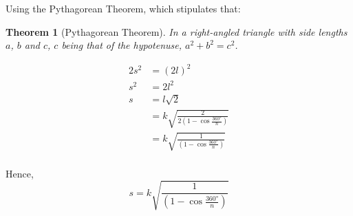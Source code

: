 \documentclass[12pt]{scrartcl}
\newtheorem{theorem}{Theorem}[section]
\begin{document}
Using the Pythagorean Theorem, which stipulates that:
\begin{theorem}[Pythagorean Theorem]
	In a right-angled triangle with side lengths $a$, $b$ and $c$, $c$ being that of the hypotenuse,
	$a^2 + b^2 = c^2$.
\end{theorem}

\begin{align*}
	2s^{2} & = \left(2l\right)^{2}                                         \\
	s^{2}  & = 2l^{2}                                                      \\
	s      & = l\sqrt{2}                                                   \\
	       & = k\sqrt{\frac{2}{2\left(1-\cos{\frac{\ang{360}}{n}}\right)}} \\
	       & = k\sqrt{\frac{1}{\left(1-\cos{\frac{\ang{360}}{n}}\right)}}  \\
\end{align*}

Hence,
\begin{equation}
	s = k\sqrt{\frac{1}{\left(1-\cos{\frac{\ang{360}}{n}}\right)}}
\end{equation}

\printbibliography
\end{document}
